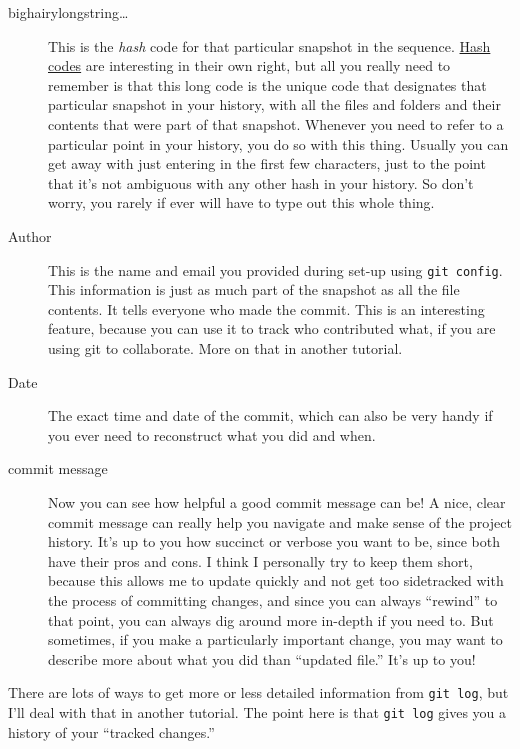 \documentclass{article}
\begin{document}
\begin{description}
\item[bighairylongstring\ldots{}] This is the \emph{hash} code for that particular snapshot in the sequence. \href{https://en.wikipedia.org/wiki/SHA-1}{Hash codes} are interesting in their own right, but all you really need to remember is that this long code is the unique code that designates that particular snapshot in your history, with all the files and folders and their contents that were part of that snapshot.  Whenever you need to refer to a particular point in your history, you do so with this thing.  Usually you can get away with just entering in the first few characters, just to the point that it's not ambiguous with any other hash in your history.  So don't worry, you rarely if ever will have to type out this whole thing.
\item[Author] This is the name and email you provided during set-up using \texttt{git config}. This information is just as much part of the snapshot as all the file contents. It tells everyone who made the commit. This is an interesting feature, because you can use it to track who contributed what, if you are using git to collaborate.  More on that in another tutorial.
\item[Date] The exact time and date of the commit, which can also be very handy if you ever need to reconstruct what you did and when.
\item[commit message] Now you can see how helpful a good commit message can be!  A nice, clear commit message can really help you navigate and make sense of the project history. It's up to you how succinct or verbose you want to be, since both have their pros and cons.  I think I personally try to keep them short, because this allows me to update quickly and not get too sidetracked with the process of committing changes, and since you can always ``rewind'' to that point, you can always dig around more in-depth if you need to.  But sometimes, if you make a particularly important change, you may want to describe more about what you did than ``updated file.''  It's up to you!
\end{description}

There are lots of ways to get more or less detailed information from \texttt{git log}, but I'll deal with that in another tutorial. The point here is that \texttt{git log} gives you a history of your ``tracked changes.''
\end{document}
